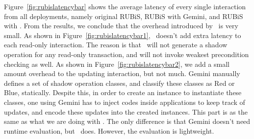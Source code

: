 Figure~\ref{fig:rubislatencybar} shows the average latency of every single interaction from
all deployments, namely original RUBiS, RUBiS with Gemini, and RUBiS
with \tool. From the results, we conclude that the overhead introduced by \tool\ is
very small. As shown in Figure~\ref{fig:rubislatencybar1}, \tool\ doesn't
add extra latency to each read-only interaction. The reason is that \tool\ will not
generate a shadow operation for any read-only transaction, and will not invoke
weakest precondition checking as well. As shown in Figure~\ref{fig:rubislatencybar2},
we add a small amount overhead to the updating interaction, but not much. Gemini manually
defines a set of shadow operation classes, and classify these classes as Red or Blue, statically.
Despite this, in order to create an instance to instantiate these classes, one using Gemini
has to inject codes inside applications to keep track of updates, and encode these updates into
the created instances. This part is as the same as what we are doing with \tool. The only difference
is that Gemini doesn't need runtime evaluation, but \tool\ does. However, the evaluation is 
lightweight.

